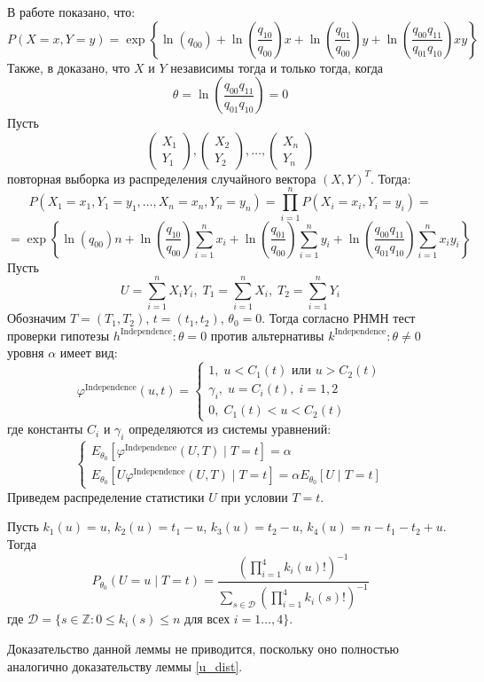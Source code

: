 В работе \cite{Dai2013} показано, что:
$$
P(X=x,Y=y)= \exp \left\{\ln(q_{00}) + 
     \ln \left(\dfrac{q_{10}}{q_{00}}\right) x
    +  \ln \left(\dfrac{q_{01}}{q_{00}}\right) y +
     \ln\left(\dfrac{q_{00}q_{11}}{q_{01}q_{10}}\right) xy
 \right\}
$$
Также, в \cite{Dai2013} доказано, что 
$X$ и $Y$ независимы тогда и только тогда, когда
$$\theta=\ln\left(\dfrac{q_{00}q_{11}}{q_{01}q_{10}}\right)=0$$
Пусть
    $$
        \begin{pmatrix}
            X_1 \\
            Y_1 
        \end{pmatrix},
        \begin{pmatrix}
            X_2 \\
            Y_2
        \end{pmatrix}, \ldots,
        \begin{pmatrix}
            X_n \\
            Y_n
        \end{pmatrix}
    $$ повторная выборка из распределения случайного вектора $(X,Y)^T$. Тогда:
$$
    P(X_1=x_1,Y_1=y_1,\ldots,X_n=x_n,Y_n=y_n)
    =\prod_{i=1}^n P(X_i=x_i,Y_i=y_i) =
    $$
    $$
    =\exp \left\{ \ln(q_{00})n + 
        \ln \left(\dfrac{q_{10}}{q_{00}}\right) \sum_{i=1}^n x_i 
        +\ln \left(\dfrac{q_{01}}{q_{00}}\right) \sum_{i=1}^{n} y_i   +
        \ln\left(\dfrac{q_{00}q_{11}}{q_{01}q_{10}}\right) \sum_{i=1}^n x_i y_i 
     \right\}
    $$
    Пусть 
    $$
    U = \sum_{i=1}^n X_i Y_i,\;
    T_1 = \sum_{i=1}^n X_i,\;
    T_2 = \sum_{i=1}^n Y_i
    $$
    Обозначим $T=(T_1,T_2)$, $t=(t_1,t_2)$, $\theta_0=0$.
    Тогда согласно \cite{Lehmann1986} РНМН тест проверки гипотезы $h^{\text{Independence}}: \theta = 0$ против альтернативы $k^{\text{Independence}}: \theta \neq 0$ 
    уровня $\alpha$ имеет вид:
    $$
    \varphi^{\text{Independence}}(u,t)=\begin{cases}
        1, \; u<C_1(t) \text{ или } u>C_2(t)\\
        \gamma_i, \; u=C_i(t), \; i=1,2\\
        0, \; C_1(t)<u<C_2(t)
    \end{cases}
    $$
    где константы $C_i$ и $\gamma_i$ определяются из системы уравнений:
    $$
    \begin{cases}
        E_{\theta_0}[\varphi^{\text{Independence}}(U,T) \mid T=t]=\alpha \\
        E_{\theta_0}[U\varphi^{\text{Independence}}(U,T) \mid T=t]=\alpha E_{\theta_0}[U \mid T=t]
    \end{cases}
    $$
    Приведем распределение статистики $U$ при условии $T=t$.
\begin{lemma}
    Пусть $k_1(u)=u$, $k_2(u)=t_1-u$, $k_3(u)=t_2-u$,
    $k_4(u)=n-t_1-t_2+u$.
        Тогда
        $$P_{\theta_0}(U=u \mid T=t)=\dfrac{(\prod_{i=1}^4 k_i(u)!)^{-1}}
            {\sum_{s\in \mathcal{D}} (\prod_{i=1}^4 k_i(s)!)^{-1}}$$
        где $\mathcal{D}=\{s \in \mathbb{Z}: 0\leq k_i(s) \leq n \text{ для всех } i=1\ldots,4\}$.
\end{lemma}
Доказательство данной леммы не приводится, поскольку оно полностью 
аналогично доказательству леммы \ref{u_dist}.


